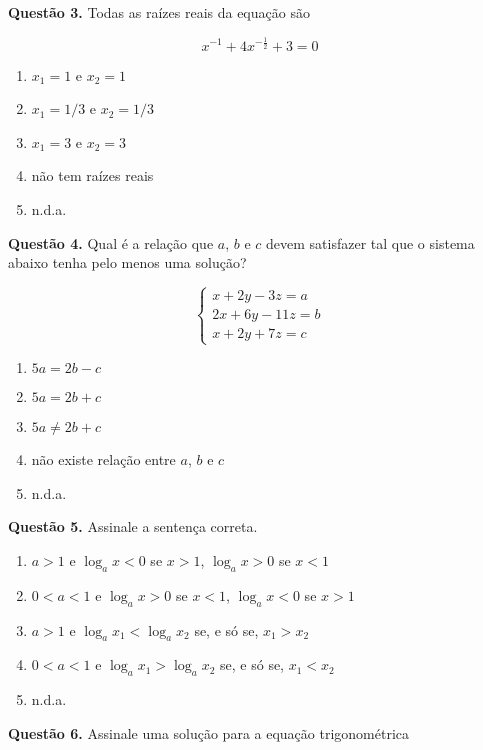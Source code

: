 \documentclass[11pt]{article}
\begin{document}
\textbf{Questão 3.} Todas as raízes reais da equação são

$$
x^{-1} + 4x^{-\frac{1}{2}} + 3 = 0
$$

\begin{multicols}{3}
    \begin{enumerate}[\bf A (\quad)]
        \item $x_1 = 1$ e $x_2 = 1$
        \item $x_1 = 1/3$ e $x_2 = 1/3$
        \item $x_1 = 3$ e $x_2 = 3$
        \item não tem raízes reais
        \item n.d.a.
    \end{enumerate}
\end{multicols}

\textbf{Questão 4.} Qual é a relação que $a$, $b$ e $c$ devem satisfazer tal que o sistema abaixo tenha pelo menos uma solução?

$$
\begin{cases}
x + 2y -3z = a\\
2x + 6y - 11z = b \\
x + 2y + 7z = c
\end{cases}
$$

\begin{enumerate}[\bf A (\quad)]
    \item $5a = 2b - c$
    \item $5a = 2b + c$
    \item $5a \neq 2b + c$
    \item não existe relação entre $a$, $b$ e $c$
    \item n.d.a.
\end{enumerate}

\textbf{Questão 5.} Assinale a sentença correta.

\begin{enumerate}[\bf A (\quad)]
    \item $a > 1$ e $\log_a x < 0$ se $x > 1$, $\log_a x > 0$ se $x < 1$
    \item $0 < a < 1$ e $\log_a x > 0$ se $x < 1$, $\log_a x < 0$ se $x > 1$
    \item $a > 1$ e $\log_a x_1 < \log_a x_2$ se, e só se, $x_1 > x_2$
    \item $0 < a < 1$ e $\log_a x_1 > \log_a x_2$ se, e só se, $x_1 < x_2$
    \item n.d.a.
\end{enumerate}

\textbf{Questão 6.} Assinale  uma  solução  para  a  equação  trigonométrica 
\end{document}
